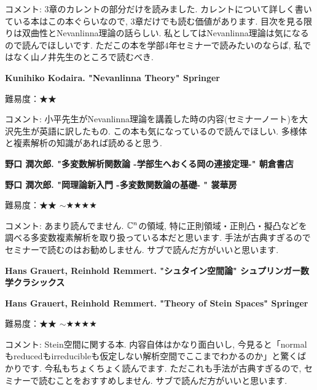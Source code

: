 コメント: 3章のカレントの部分だけを読みました. カレントについて詳しく書いている本はこの本ぐらいなので, 3章だけでも読む価値があります. 目次を見る限りは双曲性とNevanlinna理論の話らしい. 私としてはNevanlinna理論は気になるので読んでほしいです. ただこの本を学部4年セミナーで読みたいのならば, 私ではなく山ノ井先生のところで読むべき.
\vspace{8pt}

\textbf{Kunihiko Kodaira. "Nevanlinna Theory" Springer}  　\vspace{-6pt} 

難易度：★★ 　\vspace{-6pt} 

コメント: 小平先生がNevanlinna理論を講義した時の内容(セミナーノート)を大沢先生が英語に訳したもの. この本も気になっているので読んでほしい. 多様体と複素解析の知識があれば読めると思う. 
\vspace{8pt}

\textbf{野口 潤次郎. "多変数解析関数論 -学部生へおくる岡の連接定理-" 朝倉書店}  　\vspace{-6pt} 

\textbf{野口 潤次郎. "岡理論新入門 -多変数関数論の基礎- "  裳華房}  　\vspace{-6pt} 

難易度：★★ $\sim$★★★★ 　\vspace{-6pt} 

コメント: あまり読んでません. $\mathbb{C}^n$の領域, 特に正則領域・正則凸・擬凸などを調べる多変数複素解析を取り扱っている本だと思います. 手法が古典すぎるのでセミナーで読むのはお勧めしません. サブで読んだ方がいいと思います.
 \vspace{8pt}

\textbf{Hans Grauert, Reinhold Remmert. "シュタイン空間論" シュプリンガー数学クラシックス}  　\vspace{-6pt} 

\textbf{Hans Grauert, Reinhold Remmert. "Theory of Stein Spaces" Springer }  　\vspace{-6pt} 

難易度：★★ $\sim$★★★★ 　\vspace{-6pt} 

コメント: Stein空間に関する本. 内容自体はかなり面白いし, 今見ると「normalもreducedもirreducibleも仮定しない解析空間でここまでわかるのか」と驚くばかりです. 今私もちょくちょく読んでます. 
ただこれも手法が古典すぎるので, セミナーで読むことをおすすめしません. サブで読んだ方がいいと思います.
\vspace{8pt}

